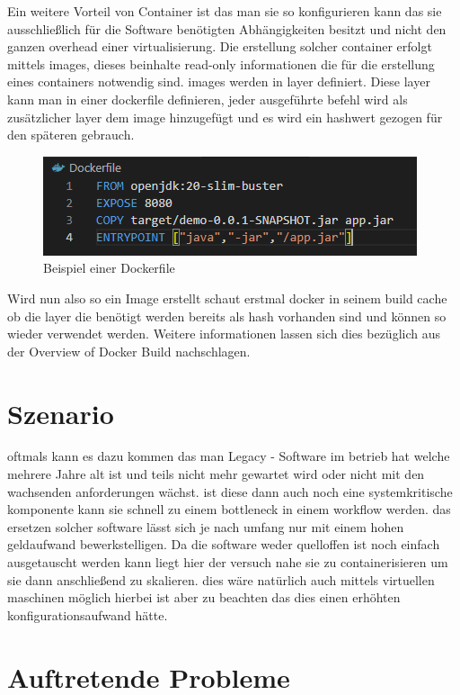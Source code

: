 Ein weitere Vorteil von Container ist das man sie so konfigurieren kann das sie ausschließlich für die Software benötigten
Abhängigkeiten besitzt und nicht den ganzen overhead einer virtualisierung. Die erstellung solcher container erfolgt mittels images, dieses beinhalte read-only informationen die für die erstellung eines containers notwendig sind. images werden in layer definiert. Diese
layer kann man in einer dockerfile definieren, jeder ausgeführte befehl wird als zusätzlicher layer dem image hinzugefügt und es wird ein hashwert gezogen für den späteren gebrauch.

\begin{figure}[h]
	\includegraphics[width=\columnwidth]{gfx/Dockerfile.png} %
	\caption{Beispiel einer Dockerfile}
\end{figure}

Wird nun also so ein Image erstellt schaut erstmal docker in seinem build cache ob die layer die benötigt werden bereits als hash vorhanden sind und können so wieder verwendet werden.
Weitere informationen lassen sich dies bezüglich aus der Overview of Docker Build \cite{dockerbuild} nachschlagen.

\section{Szenario}

oftmals kann es dazu kommen das man Legacy - Software im betrieb hat welche mehrere Jahre alt ist und teils nicht mehr gewartet wird oder nicht mit den wachsenden anforderungen wächst.
ist diese dann auch noch eine systemkritische komponente kann sie schnell zu einem bottleneck in einem workflow werden. das ersetzen solcher software lässt sich je nach umfang nur mit einem hohen geldaufwand bewerkstelligen.
Da die software weder quelloffen ist noch einfach ausgetauscht werden kann liegt hier der versuch nahe sie zu containerisieren um sie dann anschließend zu skalieren. dies wäre natürlich auch
mittels virtuellen maschinen möglich hierbei ist aber zu beachten das dies einen erhöhten konfigurationsaufwand hätte.

\section{Auftretende Probleme}

